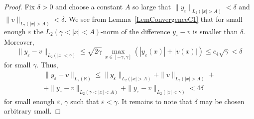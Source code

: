 \documentclass[11pt,english]{amsart}%
\begin{document}
\begin{proof}
Fix $\delta>0$ and choose a constant $A$ so large that  $\|y_\varepsilon\|_{L_2(|x|>A)}<\delta$ and $\|v\|_{L_2(|x|>A)}<\delta$.
We see from Lemma~\ref{LemConvergenceC1} that for small enough $\varepsilon$ the $L_2(\gamma<|x|<A)$-norm
of the difference $y_\varepsilon-v$ is smaller than $\delta$.
Moreover,
\begin{equation*}
    \|y_\varepsilon-v\|_{L_2(|x|<\gamma)}\leq \sqrt{2\gamma}\,\max_{x\in [-\gamma,\gamma] }\left(|y_\varepsilon(x)|+|v(x)|\right)\leq c_4\sqrt{\gamma}<\delta
\end{equation*}
for small $\gamma$.
Thus,
\begin{multline*}
   \|y_\varepsilon-v\|_{L_2(\mathbb{R})}\leq  \|y_\varepsilon\|_{L_2(|x|>A)}+\|v\|_{L_2(|x|>A)}+\\+\|y_\varepsilon-v\|_{L_2(\gamma<|x|<A)}
   + \|y_\varepsilon-v\|_{L_2(|x|<\gamma)}< 4\delta
\end{multline*}
for small enough $\varepsilon$, $\gamma$ such that $\varepsilon<\gamma$.
It remains to note that $\delta$ may be chosen arbitrary small.
\end{proof}
\end{document}
